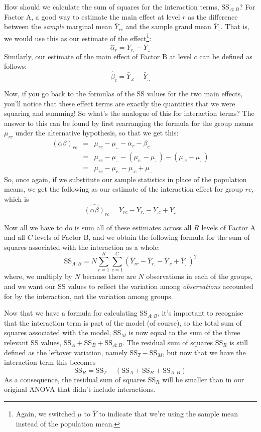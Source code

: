 \documentclass[
  11pt,
  a4paper,
  twoside,symmetric,openright]{book}
\theoremstyle{break}
\theoremstyle{break}
\begin{document}
How should we calculate the sum of squares for the interaction terms, SS\(_{A:B}\)? For Factor A, a good way to estimate the main effect at level \(r\) as the difference between the \emph{sample} marginal mean \(\bar{Y}_{rc}\) and the sample grand mean \(\bar{Y}_{..}\). That is, we would use this as our estimate of the effect\footnote{Again, we switched \(\mu\) to \(\bar{Y}\) to indicate that we're using the sample mean instead of the population mean.}:
\[
\hat{\alpha}_r = \bar{Y}_{r.} - \bar{Y}_{..}
\]
Similarly, our estimate of the main effect of Factor B at level \(c\) can be defined as follows:
\[
\hat{\beta}_c = \bar{Y}_{.c} - \bar{Y}_{..}
\]

Now, if you go back to the formulas of the SS values for the two main effects, you'll notice that these effect terms are exactly the quantities that we were squaring and summing! So what's the analogue of this for interaction terms? The answer to this can be found by first rearranging the formula for the group means \(\mu_{rc}\) under the alternative hypothesis, so that we get this:
\begin{eqnarray*} 
(\alpha \beta)_{rc} &=& \mu_{rc} - \mu_{..} - \alpha_r - \beta_c \\
&=& \mu_{rc} - \mu_{..} - (\mu_{r.} - \mu_{..}) - (\mu_{.c} - \mu_{..}) \\
&=& \mu_{rc} - \mu_{r.} - \mu_{.c} + \mu_{..}
\end{eqnarray*}
So, once again, if we substitute our sample statistics in place of the population means, we get the following as our estimate of the interaction effect for group \(rc\), which is
\[
\hat{(\alpha\beta)}_{rc} = \bar{Y}_{rc} - \bar{Y}_{r.} - \bar{Y}_{.c} + \bar{Y}_{..}
\]

Now all we have to do is sum all of these estimates across all \(R\) levels of Factor A and all \(C\) levels of Factor B, and we obtain the following formula for the sum of squares associated with the interaction as a whole:
\[
\mbox{SS}_{A:B} = N \sum_{r=1}^R \sum_{c=1}^C \left( \bar{Y}_{rc} - \bar{Y}_{r.} - \bar{Y}_{.c} + \bar{Y}_{..} \right)^2
\]
where, we multiply by \(N\) because there are \(N\) observations in each of the groups, and we want our SS values to reflect the variation among \emph{observations} accounted for by the interaction, not the variation among groups.

Now that we have a formula for calculating SS\(_{A:B}\), it's important to recognise that the interaction term is part of the model (of course), so the total sum of squares associated with the model, SS\(_M\) is now equal to the sum of the three relevant SS values, \(\mbox{SS}_A + \mbox{SS}_B + \mbox{SS}_{A:B}\). The residual sum of squares \(\mbox{SS}_R\) is still defined as the leftover variation, namely \(\mbox{SS}_T - \mbox{SS}_M\), but now that we have the interaction term this becomes
\[
\mbox{SS}_R = \mbox{SS}_T - (\mbox{SS}_A + \mbox{SS}_B + \mbox{SS}_{A:B})
\]
As a consequence, the residual sum of squares SS\(_R\) will be smaller than in our original ANOVA that didn't include interactions.
\end{document}

